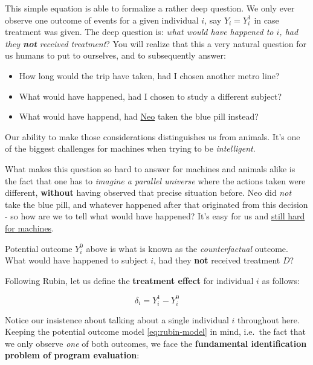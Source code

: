 \documentclass[]{book}
\providecommand{\tightlist}{%
  \setlength{\itemsep}{0pt}\setlength{\parskip}{0pt}}
\begin{document}
This simple equation is able to formalize a rather deep question. We
only ever observe one outcome of events for a given individual \(i\),
say \(Y_i = Y_i^1\) in case treatment was given. The deep question is:
\emph{what would have happened to \(i\), had they \textbf{not} received
treatment}? You will realize that this a very natural question for us
humans to put to ourselves, and to subsequently answer:

\begin{itemize}
\tightlist
\item
  How long would the trip have taken, had I chosen another metro line?
\item
  What would have happened, had I chosen to study a different subject?
\item
  What would have happend, had
  \href{https://en.wikipedia.org/wiki/Neo_(The_Matrix)}{Neo} taken the
  blue pill instead?
\end{itemize}

Our ability to make those considerations distinguishes us from animals.
It's one of the biggest challenges for machines when trying to be
\emph{intelligent}.

What makes this question so hard to answer for machines and animals
alike is the fact that one has to \emph{imagine a parallel universe}
where the actions taken were different, \textbf{without} having observed
that precise situation before. Neo did \emph{not} take the blue pill,
and whatever happened after that originated from this decision - so how
are we to tell what would have happened? It's easy for us and
\href{https://www.quantamagazine.org/to-build-truly-intelligent-machines-teach-them-cause-and-effect-20180515/}{still
hard for machines}.

Potential outcome \(Y_i^0\) above is what is known as the
\emph{counterfactual} outcome. What would have happened to subject
\(i\), had they \textbf{not} received treatment \(D\)?

Following Rubin, let us define the \textbf{treatment effect} for
individual \(i\) as follows:

\begin{equation}
\delta_i = Y_i^1 - Y_i^0 \label{eq:TE}
\end{equation}

Notice our insistence about talking about a single individual \(i\)
throughout here. Keeping the potential outcome model
\eqref{eq:rubin-model} in mind, i.e.~the fact that we only observe
\emph{one} of both outcomes, we face the \textbf{fundamental
identification problem of program evaluation}:
\end{document}

